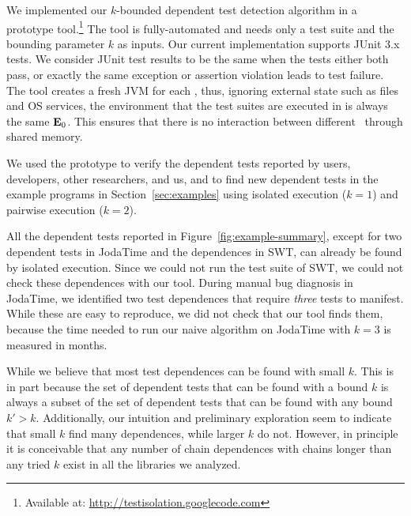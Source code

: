 
We implemented our $k$-bounded dependent test detection algorithm 
in a prototype tool.\footnote{Available at: \url{http://testisolation.googlecode.com}} 
The tool is fully-automated and needs only a test suite and the
bounding parameter $k$ as inputs. 
Our
current implementation supports JUnit 3.x tests.
We consider JUnit test results to be the same when the tests either
both pass, or exactly the same exception or assertion violation leads
to test failure.
The tool creates a fresh JVM for each \testlist, thus, ignoring
external state such as files and OS services, the environment
that the test suites are executed in is always the same $\mathbf{E}_0$.
This ensures that there is no interaction between
different \testlist\ through shared memory.

We used the prototype to verify the dependent tests reported by
users, developers, other researchers, and us, and to find new dependent
tests in the
example programs in Section~\ref{sec:examples} using isolated execution ($k = 1$)
and pairwise execution ($k = 2$).

All the dependent tests reported in Figure~\ref{fig:example-summary},
except for two dependent tests in JodaTime and the dependences in SWT, 
can already be found by isolated execution. Since we could not run the
test suite of SWT, we could not check these dependences with our tool.
During manual bug diagnosis in JodaTime, we identified two test dependences that require
\emph{three} tests to manifest. While these are easy to reproduce, we
did not check that our tool finds them, because the time needed to
run our naive algorithm on JodaTime with $k=3$ is measured in months.

While we believe that most test dependences can be found with small
$k$. This is in part because the set of dependent tests that can be
found with a bound $k$ is always a subset of the set of dependent
tests that can be found with any bound $k' > k$. Additionally, our
intuition and preliminary exploration seem to indicate that small $k$
find many dependences, while larger $k$ do not. However, in principle
it is conceivable
that any number of chain dependences with chains longer than any tried $k$ exist
in all the libraries we analyzed.



